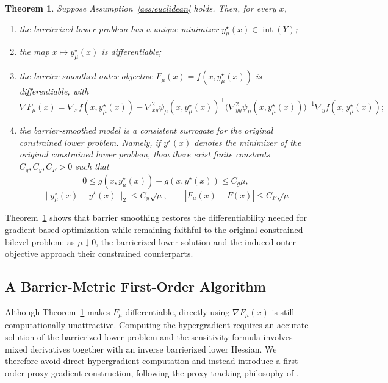 \documentclass{article}
\newtheorem{theorem}{Theorem}
\begin{document}
\begin{theorem}
\label{thm:barrier_smoothing}
Suppose Assumption~\ref{ass:euclidean} holds. Then, for every \(x\),
\begin{enumerate}[leftmargin=*]
    \item [\textup{(i)}] the barrierized lower problem has a unique minimizer
    \(y_\mu^\star(x)\in\operatorname{int}(Y)\);

    \item [\textup{(ii)}] the map \(x\mapsto y_\mu^\star(x)\) is differentiable;

    \item [\textup{(iii)}] the barrier-smoothed outer objective \(F_\mu(x)=f(x,y_\mu^\star(x))\) is differentiable,
    with
    \[
    \nabla F_\mu(x)
    =
    \nabla_x f(x,y_\mu^\star(x))
    -
    \nabla_{xy}^2\psi_\mu(x,y_\mu^\star(x))^\top
    \bigl(\nabla_{yy}^2\psi_\mu(x,y_\mu^\star(x))\bigr)^{-1}
    \nabla_y f(x,y_\mu^\star(x));
    \]

    \item [\textup{(iv)}] the barrier-smoothed model is a consistent surrogate for the original constrained lower
    problem. Namely, if \(y^\star(x)\) denotes the minimizer of the original constrained lower
    problem, then there exist finite constants \(C_g,C_y,C_F>0\) such that
    \[
    0 \le g(x,y_\mu^\star(x))-g(x,y^\star(x))\le C_g\mu,
    \]
    \[
    \|y_\mu^\star(x)-y^\star(x)\|_2\le C_y\sqrt{\mu}, \qquad |F_\mu(x)-F(x)|\le C_F\sqrt{\mu}
    \]
\end{enumerate}
\end{theorem}

Theorem~\ref{thm:barrier_smoothing} shows that barrier smoothing restores the differentiability
needed for gradient-based optimization while remaining faithful to the original constrained bilevel
problem: as \(\mu\downarrow0\), the barrierized lower solution and the induced outer objective
approach their constrained counterparts.

\subsection{A Barrier-Metric First-Order Algorithm}

Although Theorem~\ref{thm:barrier_smoothing} makes \(F_\mu\) differentiable, directly using
\(\nabla F_\mu(x)\) is still computationally unattractive. Computing the hypergradient requires an
accurate solution of the barrierized lower problem and the sensitivity formula involves mixed
derivatives together with an inverse barrierized lower Hessian. We therefore avoid direct
hypergradient computation and instead introduce a first-order proxy-gradient construction, following
the proxy-tracking philosophy of \citet{kwon2023fully}.
\end{document}
